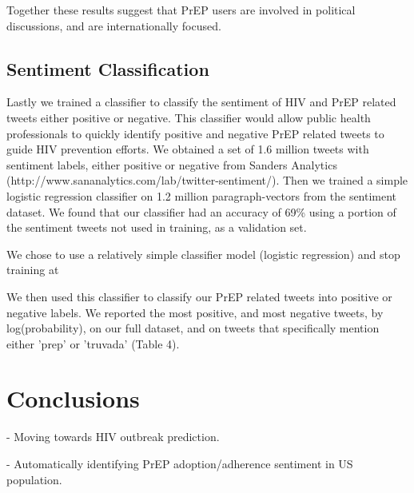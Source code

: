 \documentclass{sig-alternate-05-2015}
\begin{document}
Together these results suggest that PrEP users are involved in political discussions, and are internationally focused.



\subsection{Sentiment Classification}


Lastly we trained a classifier to classify the sentiment of HIV and PrEP related tweets either positive or negative. This classifier would allow public health professionals to quickly identify positive and negative PrEP related tweets to guide HIV prevention efforts. We obtained a set of 1.6 million tweets with sentiment labels, either positive or negative from Sanders Analytics (http://www.sananalytics.com/lab/twitter-sentiment/). Then we trained a simple logistic regression classifier on 1.2 million paragraph-vectors from the sentiment dataset. We found that our classifier had an accuracy of 69\% using a portion of the sentiment tweets not used in training, as a validation set.

 We chose to use a relatively simple classifier model (logistic regression) and stop training at

We then used this classifier to classify our PrEP related tweets into positive or negative labels. We reported the most positive, and most negative tweets, by log(probability), on our full dataset, and on tweets that specifically mention either 'prep' or 'truvada' (Table 4).




\section{Conclusions}

- Moving towards HIV outbreak prediction. 

- Automatically identifying PrEP adoption/adherence sentiment in US population.



\end{document}

